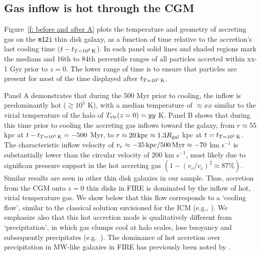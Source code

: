 \documentclass[fleqn,usenatbib]{mnras}
\newcommand{\tcon}{t_{T=10^5\,{\rm K}}}
\newcommand{\Tvir}{T_{\rm vir}}
\begin{document}
\subsection{Gas inflow is hot through the CGM}
\label{s: characteristics -- inflowing gas phase}

Figure~\ref{f: before and after A} plots the temperature and geometry of accreting gas on the \texttt{m12i} thin disk galaxy, as a function of time relative to the accretion's last cooling time ($t - \tcon$).
In each panel solid lines and shaded regions mark the medians and 16th to 84th percentile ranges of all particles accreted within xx-1 Gyr prior to $z=0$. The lower range of time is to ensure that particles are present for most of the time displayed after $\tcon$.

Panel A demonstrates that during the 500 Myr prior to cooling, the inflow is predominantly hot ($\gtrsim 10^5$ K), with a median temperature of $\approx xx$ similar to the virial temperature of the halo of $\Tvir(z=0)=yy$ K. Panel B shows that during this time prior to cooling the accreting gas inflows toward the galaxy, from $r\approx55$ kpc at $t-\tcon=-500$ Myr, to $r\approx20\,{\rm kpc}\approx1.3 R_{\rm gal}$ kpc at $t=\tcon$. The characteristic inflow velocity of $v_r\approx -35\,{\rm kpc}/500\,{\rm Myr}\approx-70$ km s$^{-1}$ is substantially lower than the circular velocity of $200$ km s$^{-1}$, most likely due to significan pressure support in the hot accreting gas $(1-(v_r/v_c)^2\approx87\%)$. 
Similar results are seen in other thin disk galaxies in our sample. Thus, accretion from the CGM onto $z=0$ thin disks in FIRE is dominated by the inflow of hot, virial temperature gas. We show below that this flow corresponds to a `cooling flow', similar to the classical solution envisioned for the ICM (e.g., \citealt{Mathews1978}).  We emphasize also that this hot accretion mode is qualitatively different from `precipitation', in which gas clumps cool at halo scales, lose buoyancy and subsequently precipitates (e.g.~\citealt{Maller2004,Voit2017}). The dominance of hot accretion over precipitation in MW-like galaxies in FIRE has previously been noted by \cite{Esmerian2020}. 
\end{document}

